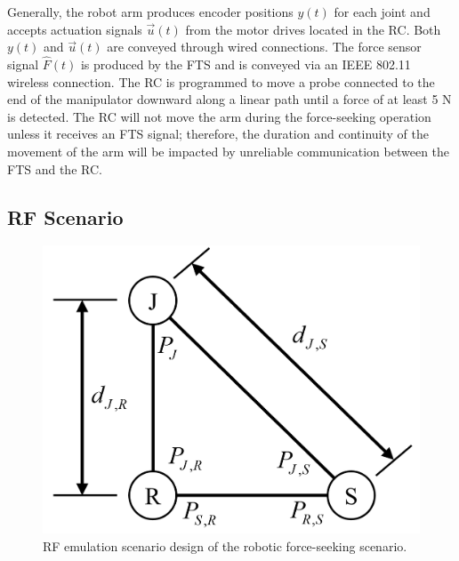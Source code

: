 
Generally, the robot arm produces encoder positions $y(t)$ for each joint and accepts actuation signals $\vec{u}(t)$ from the motor drives located in the RC.  Both $y(t)$ and $\vec{u}(t)$ are conveyed through wired connections. The force sensor signal $\hat{F}(t)$ is produced by the FTS and is conveyed via an IEEE 802.11 wireless connection. The RC is programmed to move a probe connected to the end of the manipulator downward along a linear path until a force of at least 5 N is detected.  The RC will not move the arm during the force-seeking operation unless it receives an FTS signal; therefore, the duration and continuity of the movement of the arm will be impacted by unreliable communication between the FTS and the RC.

\subsection{RF Scenario}\label{sec:rfemulator}

\begin{figure}[tbp]
    \centering
    \includegraphics[width=0.75\columnwidth]{./chapter-ftml/diagrams/emulation-model}
    \caption{RF emulation scenario design of the robotic force-seeking scenario.}
    \label{fig:rf-emulation-scenario}
\end{figure}


